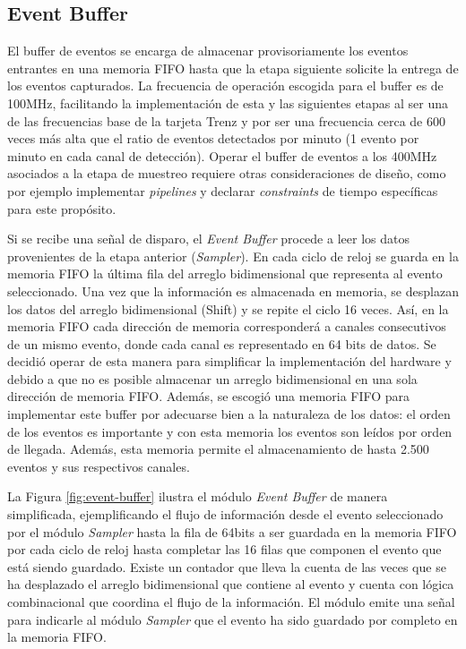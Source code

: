 	
	\subsection{Event Buffer}
	\label{sec:buffer}
	
	El buffer de eventos se encarga de almacenar provisoriamente los eventos entrantes en una memoria FIFO hasta que la etapa siguiente solicite la entrega de los eventos capturados. La frecuencia de operación escogida para el buffer es de 100MHz, facilitando la implementación de esta y las siguientes etapas al ser una de las frecuencias base de la tarjeta Trenz y por ser una frecuencia cerca de 600 veces más alta que el ratio de eventos detectados por minuto (1 evento por minuto en cada canal de detección). Operar el buffer de eventos a los 400MHz asociados a la etapa de muestreo requiere otras consideraciones de diseño, como por ejemplo implementar \textit{pipelines} y declarar \textit{constraints} de tiempo específicas para este propósito\cite{XilinxFIFOSuite}. 
	
	Si se recibe una señal de disparo, el \textit{Event Buffer} procede a leer los datos provenientes de la etapa anterior (\textit{Sampler}). En cada ciclo de reloj se guarda en la memoria FIFO la última fila del arreglo bidimensional que representa al evento seleccionado. Una vez que la información es almacenada en memoria, se desplazan los datos del arreglo bidimensional (Shift) y se repite el ciclo 16 veces. Así, en la memoria FIFO cada dirección de memoria corresponderá a canales consecutivos de un mismo evento, donde cada canal es representado en 64 bits de datos. Se decidió operar de esta manera para simplificar la implementación del hardware y debido a que no es posible almacenar un arreglo bidimensional en una sola dirección de memoria FIFO. Además, se escogió una memoria FIFO para implementar este buffer por adecuarse bien a la naturaleza de los datos: el orden de los eventos es importante y con esta memoria los eventos son leídos por orden de llegada. Además, esta memoria permite el almacenamiento de hasta 2.500 eventos y sus respectivos canales.
	
	La Figura \ref{fig:event-buffer} ilustra el módulo \textit{Event Buffer} de manera simplificada, ejemplificando el flujo de información desde el evento seleccionado por el módulo \textit{Sampler} hasta la fila de 64bits a ser guardada en la memoria FIFO por cada ciclo de reloj hasta completar las 16 filas que componen el evento que está siendo guardado. Existe un contador que lleva la cuenta de las veces que se ha desplazado el arreglo bidimensional que contiene al evento y cuenta con lógica combinacional que coordina el flujo de la información. El módulo emite una señal para indicarle al módulo \textit{Sampler} que el evento ha sido guardado por completo en la memoria FIFO.
	
